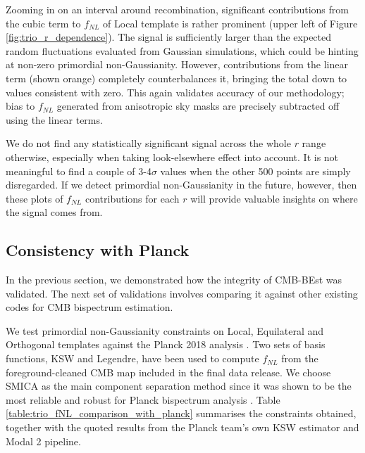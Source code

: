 Zooming in on an interval around recombination, significant contributions from the cubic term to $f_{NL}$ of Local template is rather prominent (upper left of Figure \ref{fig:trio_r_dependence}). The signal is sufficiently larger than the expected random fluctuations evaluated from Gaussian simulations, which could be hinting at non-zero primordial non-Gaussianity. However, contributions from the linear term (shown orange) completely counterbalances it, bringing the total down to values consistent with zero. This again validates accuracy of our methodology; bias to $f_{NL}$ generated from anisotropic sky masks are precisely subtracted off using the linear terms.

We do not find any statistically significant signal across the whole $r$ range otherwise, especially when taking look-elsewhere effect into account. It is not meaningful to find a couple of 3-4$\sigma$ values when the other 500 points are simply disregarded. If we detect primordial non-Gaussianity in the future, however, then these plots of $f_{NL}$ contributions for each $r$ will provide valuable insights on where the signal comes from.



\subsection{Consistency with Planck} \label{section:consistency_with_Planck}

In the previous section, we demonstrated how the integrity of CMB-BEst was validated. The next set of validations involves comparing it against other existing codes for CMB bispectrum estimation.

We test primordial non-Gaussianity constraints on Local, Equilateral and Orthogonal templates against the Planck 2018 analysis \cite{PlanckCollaboration2018}. Two sets of basis functions, KSW and Legendre, have been used to compute $f_{NL}$ from the foreground-cleaned CMB map included in the final data release. We choose SMICA as the main component separation method since it was shown to be the most reliable and robust for Planck bispectrum analysis \cite{PlanckCollaboration2013ComponentSeparation, PlanckCollaboration2013,PlanckCollaboration2015,PlanckCollaboration2018}. Table \ref{table:trio_fNL_comparison_with_planck} summarises the constraints obtained, together with the quoted results from the Planck team's own KSW estimator and Modal 2 pipeline.

